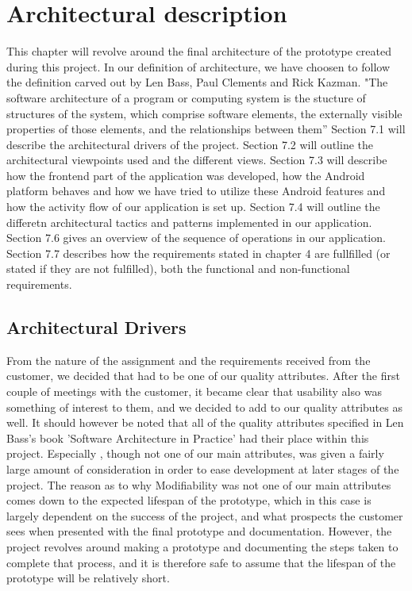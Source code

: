 \chapter{Architectural description}
	This chapter will revolve around the final architecture of the prototype created during this project. In our definition of architecture, we have choosen to follow the definition carved out by
	Len Bass, Paul Clements and Rick Kazman. 
	\newline
	\newline
	"The software architecture of a program or computing system is the stucture of structures of the system, which comprise software elements, the externally visible properties of those elements, and the relationships between them''\cite[p. 3]{bib:archi}
	\newline
	\newline
	Section 7.1 will describe the architectural drivers of the project. Section 7.2 will outline the architectural viewpoints used and the different views. Section 7.3 will describe how the frontend part of the application was developed, how the Android platform behaves and how we have tried to utilize these Android features and how the activity flow of our application is set up. Section 7.4 will outline the differetn architectural tactics and patterns implemented in our application. Section 7.6 gives an overview of the sequence of operations in our application. Section 7.7 describes how the requirements stated in chapter 4 are fullfilled (or stated if they are not fulfilled), both the functional and non-functional requirements.  
	
\section{Architectural Drivers}
	From the nature of the assignment and the requirements received from the customer, we decided that  had to be one of our quality attributes. After the first couple of meetings with the customer, it became clear that usability also was something of interest to them, and we decided to add  to our quality attributes as well. It should however be noted that all of the quality attributes specified in Len Bass's book 'Software Architecture in Practice'\cite{bib:archi} had their place within this project. Especially , though not one of our main attributes, was given a fairly large amount of consideration in order to ease development at later stages of the project. The reason as to why Modifiability was not one of our main attributes comes down to the expected lifespan of the prototype, which in this case is largely dependent on the success of the project, and what prospects the customer sees when presented with the final prototype and documentation. However, the project revolves around making a prototype and documenting the steps taken to complete that process, and it is therefore safe to assume that the lifespan of the prototype will be relatively short. 

